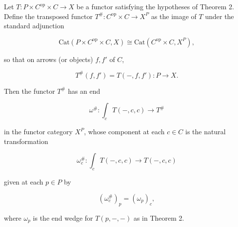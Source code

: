 Let $T: P \times C^{\mathrm{op}} \times C \to X$ be a functor satisfying the hypotheses of Theorem 2. Define the transposed functor $T^\#: C^{\mathrm{op}} \times C \to X^P$ as the image of $T$ under the standard adjunction

$$\mathrm{Cat}(P \times C^{\mathrm{op}} \times C, X) \cong \mathrm{Cat}(C^{\mathrm{op}} \times C, X^P),$$

so that on arrows (or objects) $f, f'$ of $C$,

$$T^\#(f, f') = T(-, f, f'): P \to X.$$

Then the functor $T^\#$ has an end

$$\omega^\#: \int_c T(-, c, c) \to T^\#$$

in the functor category $X^P$, whose component at each $c \in C$ is the natural transformation

$$\omega_c^\#: \int_c T(-, c, c) \to T(-, c, c)$$

given at each $p \in P$ by

$$(\omega_c^\#)_p = (\omega_p)_c,$$

where $\omega_p$ is the end wedge for $T(p, -, -)$ as in Theorem 2.
